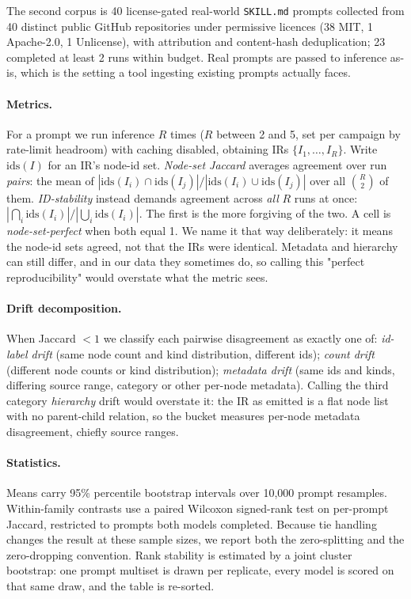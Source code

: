 \documentclass{article}
\begin{document}
The second corpus is 40 license-gated real-world \texttt{SKILL.md} prompts collected from 40 distinct public GitHub repositories under permissive licences (38 MIT, 1 Apache-2.0, 1 Unlicense), with attribution and content-hash deduplication; 23 completed at least 2 runs within budget. Real prompts are passed to inference as-is, which is the setting a tool ingesting existing prompts actually faces.

\paragraph{Metrics.}
For a prompt we run inference $R$ times ($R$ between 2 and 5, set per campaign by rate-limit headroom) with caching disabled, obtaining IRs $\{I_1,\dots,I_R\}$.
Write $\mathrm{ids}(I)$ for an IR's node-id set. \emph{Node-set Jaccard} averages agreement over run \emph{pairs}: the mean of $|\mathrm{ids}(I_i)\cap\mathrm{ids}(I_j)|/|\mathrm{ids}(I_i)\cup\mathrm{ids}(I_j)|$ over all $\binom{R}{2}$ of them. \emph{ID-stability} instead demands agreement across \emph{all} $R$ runs at once: $|\bigcap_i \mathrm{ids}(I_i)|/|\bigcup_i \mathrm{ids}(I_i)|$. The first is the more forgiving of the two.
A cell is \emph{node-set-perfect} when both equal 1. We name it that way deliberately: it means the node-id sets agreed, not that the IRs were identical. Metadata and hierarchy can still differ, and in our data they sometimes do, so calling this "perfect reproducibility" would overstate what the metric sees.

\paragraph{Drift decomposition.}
When Jaccard $<1$ we classify each pairwise disagreement as exactly one of: \emph{id-label drift} (same node count and kind distribution, different ids); \emph{count drift} (different node counts or kind distribution); \emph{metadata drift} (same ids and kinds, differing source range, category or other per-node metadata). Calling the third category \emph{hierarchy} drift would overstate it: the IR as emitted is a flat node list with no parent-child relation, so the bucket measures per-node metadata disagreement, chiefly source ranges.

\paragraph{Statistics.}
Means carry 95\% percentile bootstrap intervals over 10{,}000 prompt resamples. Within-family contrasts use a paired Wilcoxon signed-rank test on per-prompt Jaccard, restricted to prompts both models completed. Because tie handling changes the result at these sample sizes, we report both the zero-splitting and the zero-dropping convention. Rank stability is estimated by a joint cluster bootstrap: one prompt multiset is drawn per replicate, every model is scored on that same draw, and the table is re-sorted.
\end{document}
